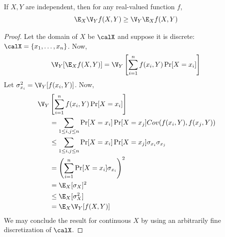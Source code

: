 \begin{lemma}\label{lem:fact}
If $X,Y$ are independent, then for any real-valued function $f$,
\[
\E_X \V_Y f(X,Y) \geq \V_Y \E_X f(X,Y)
\]
\end{lemma}
\begin{proof}
Let the domain of $X$ be $\calX$ and suppose it is discrete: $\calX = \{x_1, \ldots, x_n\}$. Now,
\[
\V_Y [\E_X f(X,Y)] = \V_Y\left[\sum_{i=1}^n f(x_i,Y) \Pr[X=x_i]\right]
\]
Let $\sigma_{x_i}^2 = \V_Y[f(x_i,Y)]$. Now,
\begin{align*}
&\: \V_Y\left[\sum_{i=1}^n f(x_i,Y) \Pr[X=x_i]\right] \\
&\hspace{2em}= \sum_{1 \leq i,j \leq n} \Pr[X=x_i]\Pr[X=x_j] Cov(f(x_i,Y), f(x_j,Y)) \\
&\hspace{2em}\leq \sum_{1 \leq i,j \leq n} \Pr[X=x_i]\Pr[X=x_j] \sigma_{x_i} \sigma_{x_j} \\
&\hspace{2em}= \left(\sum_{i=1}^n \Pr[X=x_i] \sigma_{x_i}\right)^2 \\
&\hspace{2em}= \E_X[\sigma_X]^2 \\
&\hspace{2em}\leq \E_X[\sigma_X^2] \\
&\hspace{2em}= \E_X \V_Y[f(X,Y)]
\end{align*}
We may conclude the result for continuous $X$ by using an arbitrarily fine discretization of $\calX$.
\end{proof}

